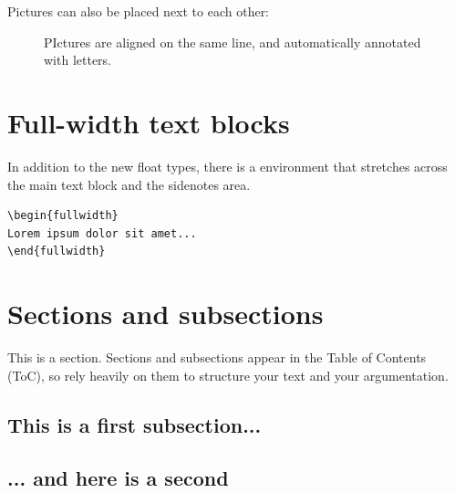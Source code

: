 Pictures can also be placed next to each other:
\begin{figure}
\caption{PIctures are aligned on the same line, and automatically annotated with letters.}
\label{fig:ushaped}
\end{figure}

\section{Full-width text blocks}

In addition to the new float types, there is a 
environment that stretches across the main text block and the sidenotes
area.

\begin{Verbatim}
\begin{fullwidth}
Lorem ipsum dolor sit amet...
\end{fullwidth}
\end{Verbatim}

\begin{fullwidth}
\small\itshape\lipsum[1]
\end{fullwidth}


\section{Sections and subsections}

This is a section. Sections and subsections appear in the Table of Contents (ToC), so rely heavily on them to structure your text and your argumentation.

\subsection{This is a first subsection...}

\subsection{... and here is a second}

